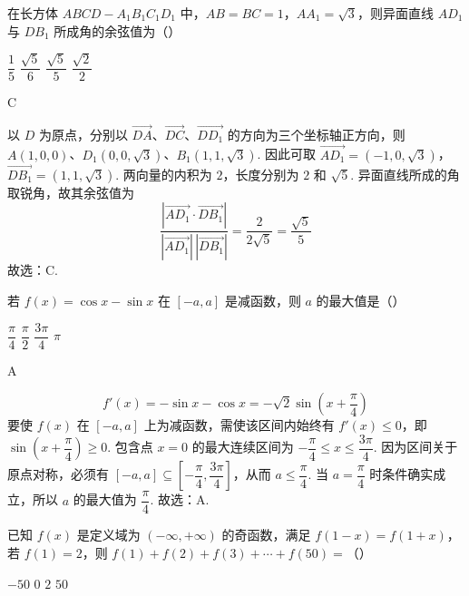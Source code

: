 \begin{problem}
在长方体 \(ABCD-A_1B_1C_1D_1\) 中，\(AB=BC=1\)，\(AA_1=\sqrt3\)，则异面直线 \(AD_1\) 与 \(DB_1\) 所成角的余弦值为（\quad）

\choices
    {\(\dfrac15\)}
    {\(\dfrac{\sqrt5}{6}\)}
    {\(\dfrac{\sqrt5}{5}\)}
    {\(\dfrac{\sqrt2}{2}\)}
\end{problem}

\begin{answer}
C
\end{answer}

\begin{solution}
以 \(D\) 为原点，分别以 \(\overrightarrow{DA}\)、\(\overrightarrow{DC}\)、\(\overrightarrow{DD_1}\) 的方向为三个坐标轴正方向，则
\(A(1,0,0)\)、\(D_1(0,0,\sqrt3)\)、\(B_1(1,1,\sqrt3)\). 因此可取
\(\overrightarrow{AD_1}=(-1,0,\sqrt3)\)，\(\overrightarrow{DB_1}=(1,1,\sqrt3)\).
两向量的内积为 \(2\)，长度分别为 \(2\) 和 \(\sqrt5\). 异面直线所成的角取锐角，故其余弦值为
\[
\frac{|\overrightarrow{AD_1}\cdot\overrightarrow{DB_1}|}{|\overrightarrow{AD_1}|\,|\overrightarrow{DB_1}|}=\frac2{2\sqrt5}=\frac{\sqrt5}{5}
\]
故选：C.
\end{solution}

\begin{problem}
若 \(f(x)=\cos x-\sin x\) 在 \([-a,a]\) 是减函数，则 \(a\) 的最大值是（\quad）

\choices
    {\(\dfrac{\pi}{4}\)}
    {\(\dfrac{\pi}{2}\)}
    {\(\dfrac{3\pi}{4}\)}
    {\(\pi\)}
\end{problem}

\begin{answer}
A
\end{answer}

\begin{solution}
\[
f'(x)=-\sin x-\cos x=-\sqrt2\sin\left(x+\frac\pi4\right)
\]
要使 \(f(x)\) 在 \([-a,a]\) 上为减函数，需使该区间内始终有
\(f'(x)\le0\)，即 \(\sin\left(x+\dfrac\pi4\right)\ge0\). 包含点 \(x=0\) 的最大连续区间为
\(-\dfrac\pi4\le x\le\dfrac{3\pi}4\). 因为区间关于原点对称，必须有
\([-a,a]\subseteq\left[-\dfrac\pi4,\dfrac{3\pi}4\right]\)，从而
\(a\le\dfrac\pi4\). 当 \(a=\dfrac\pi4\) 时条件确实成立，所以 \(a\) 的最大值为
\(\dfrac\pi4\).
故选：A.
\end{solution}

\begin{problem}
已知 \(f(x)\) 是定义域为 \((-\infty,+\infty)\) 的奇函数，满足 \(f(1-x)=f(1+x)\)，若 \(f(1)=2\)，则 \(f(1)+f(2)+f(3)+\cdots+f(50)=\)（\quad）

\choices
    {\(-50\)}
    {\(0\)}
    {\(2\)}
    {\(50\)}
\end{problem}

